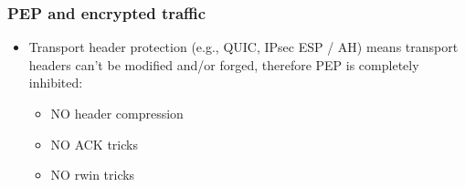 \begin{frame}
  \frametitle{PEP and encrypted traffic}
  \begin{itemize}
    \item Transport header protection (e.g., QUIC, IPsec ESP / AH) means transport headers can't be modified and/or forged, therefore PEP is completely inhibited:
    \begin{itemize}
      \item NO header compression
      \item NO ACK tricks
      \item NO rwin tricks
    \end{itemize}
  \end{itemize}
\end{frame}
